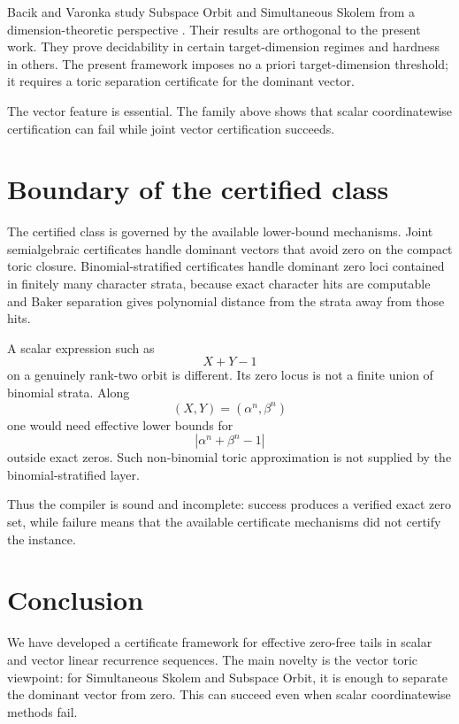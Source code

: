 \documentclass[11pt]{article}
\begin{document}
Bacik and Varonka study Subspace Orbit and Simultaneous Skolem from a dimension-theoretic perspective \cite{BacikVaronka}. Their results are orthogonal to the present work. They prove decidability in certain target-dimension regimes and hardness in others. The present framework imposes no a priori target-dimension threshold; it requires a toric separation certificate for the dominant vector.

The vector feature is essential. The family above shows that scalar coordinatewise certification can fail while joint vector certification succeeds.

\section{Boundary of the certified class}

The certified class is governed by the available lower-bound mechanisms. Joint semialgebraic certificates handle dominant vectors that avoid zero on the compact toric closure. Binomial-stratified certificates handle dominant zero loci contained in finitely many character strata, because exact character hits are computable and Baker separation gives polynomial distance from the strata away from those hits.

A scalar expression such as
\[
X+Y-1
\]
on a genuinely rank-two orbit is different. Its zero locus is not a finite union of binomial strata. Along
\[
(X,Y)=(\alpha^n,\beta^n)
\]
one would need effective lower bounds for
\[
|\alpha^n+\beta^n-1|
\]
outside exact zeros. Such non-binomial toric approximation is not supplied by the binomial-stratified layer.

Thus the compiler is sound and incomplete: success produces a verified exact zero set, while failure means that the available certificate mechanisms did not certify the instance.

\section{Conclusion}

We have developed a certificate framework for effective zero-free tails in scalar and vector linear recurrence sequences. The main novelty is the vector toric viewpoint: for Simultaneous Skolem and Subspace Orbit, it is enough to separate the dominant vector from zero. This can succeed even when scalar coordinatewise methods fail.
\end{document}
